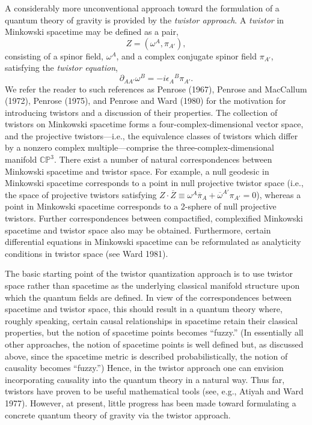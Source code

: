 A considerably more unconventional approach toward the formulation of a quantum
theory of gravity is provided by the \emph{twistor approach}. A \emph{twistor} in Minkowski
spacetime may be defined as a pair,
\begin{equation}
  Z=(\omega^A,\pi_{A'}),
  \tag{14.1.9}\label{eq:14.1.9}
\end{equation}
consisting of a spinor field, \(\omega^A\), and a complex conjugate spinor field
\(\pi_{A'}\), satisfying the \emph{twistor equation},
\begin{equation}
  \partial_{AA'}\omega^B=-i\epsilon_A{}^B\pi_{A'}.
  \tag{14.1.10}\label{eq:14.1.10}
\end{equation}
We refer the reader to such references as Penrose (1967), Penrose and MacCallum
(1972), Penrose (1975), and Penrose and Ward (1980) for the motivation for
introducing twistors and a discussion of their properties. The collection of twistors on
Minkowski spacetime forms a four-complex-dimensional vector space, and the
projective twistors---i.e., the equivalence classes of twistors which differ by a nonzero
complex multiple---comprise the three-complex-dimensional manifold \(\mathbb{CP}^3\).
There exist a number of natural correspondences between Minkowski spacetime and
twistor space. For example, a null geodesic in Minkowski spacetime corresponds to
a point in null projective twistor space (i.e., the space of projective twistors satisfying
\(Z\mathbin{\cdot}\overline Z\equiv
\omega^A\overline\pi_A+\overline\omega^{A'}\pi_{A'}=0\)), whereas a point in
Minkowski spacetime corresponds to a 2-sphere of null projective twistors. Further
correspondences between compactified, complexified Minkowski spacetime and twistor
space also may be obtained. Furthermore, certain differential equations in Minkowski
spacetime can be reformulated as analyticity conditions in twistor space (see Ward 1981).

The basic starting point of the twistor quantization approach is to use twistor space
rather than spacetime as the underlying classical manifold structure upon which the
quantum fields are defined. In view of the correspondences between spacetime and
twistor space, this should result in a quantum theory where, roughly speaking,
certain causal relationships in spacetime retain their classical properties, but the
notion of spacetime points becomes ``fuzzy.'' (In essentially all other approaches, the
notion of spacetime points is well defined but, as discussed above, since the spacetime
metric is described probabilistically, the notion of causality becomes ``fuzzy.'')
Hence, in the twistor approach one can envision incorporating causality into the
quantum theory in a natural way. Thus far, twistors have proven to be useful
mathematical tools (see, e.g., Atiyah and Ward 1977). However, at present, little
progress has been made toward formulating a concrete quantum theory of gravity via
the twistor approach.

